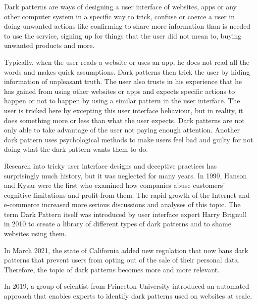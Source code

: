 Dark patterns\cite{dark-patterns-brignull, dark-patterns-colin, the-year-dark-pattern-won, dark-patterns-at-scale} are ways of designing a user interface of websites, apps or any other computer system in a specific way to trick, confuse or coerce a user in doing unwanted actions like confirming to share more information than is needed to use the service, signing up for things that the user did not mean to, buying unwanted products and more. 

Typically, when the user reads a website or uses an app, he does not read all the words and makes quick assumptions\cite{dark-patterns-brignull}. Dark patterns then trick the user by hiding information of unpleasant truth. The user also trusts in his experience that he has gained from using other websites or apps and expects specific actions to happen or not to happen by using a similar pattern in the user interface. The user is tricked here by excepting this user interface behaviour, but in reality, it does something more or less than what the user expects\cite{the-year-dark-pattern-won}. Dark patterns are not only able to take advantage of the user not paying enough attention. Another dark pattern uses psychological methods to make users feel bad and guilty for not doing what the dark pattern wants them to do\cite{the-year-dark-pattern-won}.

Research into tricky user interface designs and deceptive practices has surprisingly much history, but it was neglected for many years. In 1999, Hanson and Kysar were the first who examined how companies abuse customers' cognitive limitations and profit from them. The rapid growth of the Internet and e-commerce increased more serious discussions and analyses of this topic. The term Dark Pattern itself was introduced by user interface expert Harry Brignull in 2010 to create a library of different types of dark patterns and to shame websites using them\cite{dark-patterns-brignull-about-us}. 


In March 2021, the state of California added new regulation that now bans dark patterns that prevent users from opting out of the sale of their personal data\cite{california-bans-dark-patterns}. Therefore, the topic of dark patterns becomes more and more relevant.


In 2019, a group of scientist from Princeton University introduced an automated approach that enables experts to identify dark patterns used on websites at scale\cite{dark-patterns-at-scale}. 

